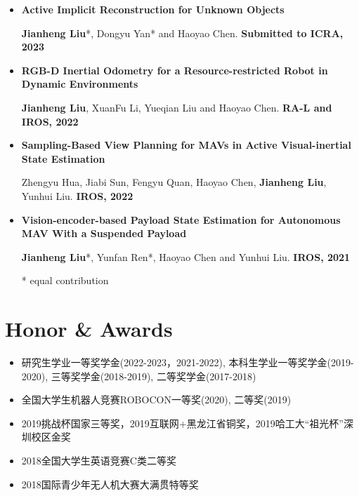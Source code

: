 \documentclass[11pt,a4paper,sans]{moderncv}        %
\begin{document}
\begin{itemize}

    \item{\textbf{Active Implicit Reconstruction for Unknown Objects}

    \small{\textbf{Jianheng Liu}*, Dongyu Yan* and Haoyao Chen. \textbf{Submitted to ICRA, 2023}}
    }
    
    \vspace{3pt}


\item{\textbf{RGB-D Inertial Odometry for a Resource-restricted Robot in Dynamic Environments}

\small{\textbf{Jianheng Liu}, XuanFu Li, Yueqian Liu and Haoyao Chen. \textbf{RA-L and IROS, 2022}}
}

\vspace{3pt}

\item{\textbf{Sampling-Based View Planning for MAVs in Active Visual-inertial State Estimation}

\small{Zhengyu Hua, Jiabi Sun, Fengyu Quan, Haoyao Chen, \textbf{Jianheng Liu}, Yunhui Liu. \textbf{IROS, 2022}}
}

\vspace{3pt}

\item{\textbf{Vision-encoder-based Payload State Estimation for Autonomous MAV With a Suspended Payload}

\small{\textbf{Jianheng Liu}*, Yunfan Ren*, Haoyao Chen and Yunhui Liu. \textbf{IROS, 2021}}
}

\footnotesize{* equal contribution}

\end{itemize}

\section{Honor \& Awards}

\begin{itemize}

\item{研究生学业一等奖学金(2022-2023，2021-2022), 本科生学业一等奖学金(2019-2020), 三等奖学金(2018-2019), 二等奖学金(2017-2018)}

\item{全国大学生机器人竞赛ROBOCON一等奖(2020), 二等奖(2019)}

\item{2019挑战杯国家三等奖，2019互联网+黑龙江省铜奖，2019哈工大“祖光杯”深圳校区金奖}

\item{2018全国大学生英语竞赛C类二等奖}

\item{2018国际青少年无人机大赛大满贯特等奖}

\end{itemize}
\end{document}
